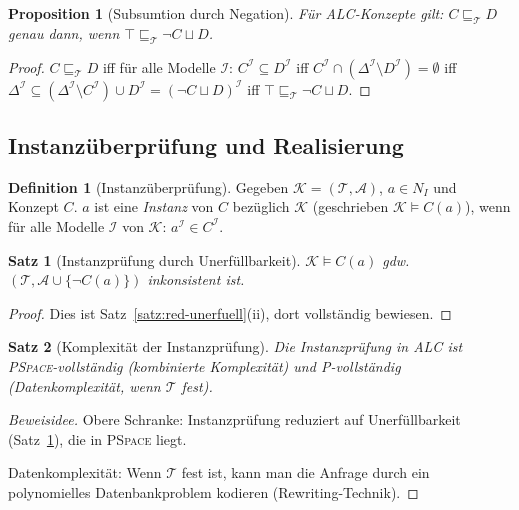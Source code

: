 ﻿\documentclass[a4paper,12pt]{article}
\theoremstyle{definition}
\newtheorem{definition}{Definition}[section]
\theoremstyle{plain}
\newtheorem{satz}{Satz}[section]
\newtheorem{proposition}{Proposition}[section]
\theoremstyle{remark}
\newcommand{\Tbox}{\ensuremath{\mathcal{T}}}
\newcommand{\Abox}{\ensuremath{\mathcal{A}}}
\newcommand{\KB}{\ensuremath{\mathcal{K}}}
\newcommand{\interp}[1]{\ensuremath{\mathcal{#1}}}
\newcommand{\Dom}[1]{\ensuremath{\Delta^{\interp{#1}}}}
\begin{document}
\begin{proposition}[Subsumtion durch Negation]
F{\"{u}}r \textsf{ALC}-Konzepte gilt:
$C \sqsubseteq_\Tbox D$ genau dann, wenn
$\top \sqsubseteq_\Tbox \neg C \sqcup D$.
\end{proposition}

\begin{proof}
$C \sqsubseteq_\Tbox D$
iff f{\"{u}}r alle Modelle $\interp{I}$: $C^\interp{I} \subseteq D^\interp{I}$
iff $C^\interp{I} \cap (\Dom{I} \setminus D^\interp{I}) = \emptyset$
iff $\Dom{I} \subseteq (\Dom{I} \setminus C^\interp{I}) \cup D^\interp{I}
= (\neg C \sqcup D)^\interp{I}$
iff $\top \sqsubseteq_\Tbox \neg C \sqcup D$.
\end{proof}

\subsection{Instanz{\"{u}}berpr{\"{u}}fung und Realisierung}

\begin{definition}[Instanz{\"{u}}berpr{\"{u}}fung]
Gegeben $\KB = (\Tbox, \Abox)$, $a \in N_I$ und Konzept $C$.
$a$ ist eine \emph{Instanz} von $C$ bez{\"{u}}glich $\KB$
(geschrieben $\KB \models C(a)$), wenn f{\"{u}}r alle Modelle $\interp{I}$
von $\KB$: $a^\interp{I} \in C^\interp{I}$.
\end{definition}

\begin{satz}[Instanzpr{\"{u}}fung durch Unerf{\"{u}}llbarkeit]
\label{satz:instanz}
$\KB \models C(a)$ gdw.\ $(\Tbox, \Abox \cup \{\neg C(a)\})$
inkonsistent ist.
\end{satz}

\begin{proof}
Dies ist Satz~\ref{satz:red-unerfuell}(ii), dort vollst{\"{a}}ndig bewiesen.
\end{proof}

\begin{satz}[Komplexit{\"{a}}t der Instanzpr{\"{u}}fung]
Die Instanzpr{\"{u}}fung in \textsf{ALC} ist \textsc{PSpace}-vollst{\"{a}}ndig
(kombinierte Komplexit{\"{a}}t) und \textsc{P}-vollst{\"{a}}ndig
(Datenkomplexit{\"{a}}t, wenn $\Tbox$ fest).
\end{satz}

\begin{proof}[Beweisidee]
Obere Schranke: Instanzpr{\"{u}}fung reduziert auf Unerf{\"{u}}llbarkeit
(Satz~\ref{satz:instanz}), die in \textsc{PSpace} liegt.

Datenkomplexit{\"{a}}t: Wenn $\Tbox$ fest ist, kann man die Anfrage
durch ein polynomielles Datenbankproblem kodieren (Rewriting-Technik).
\end{proof}
\end{document}

